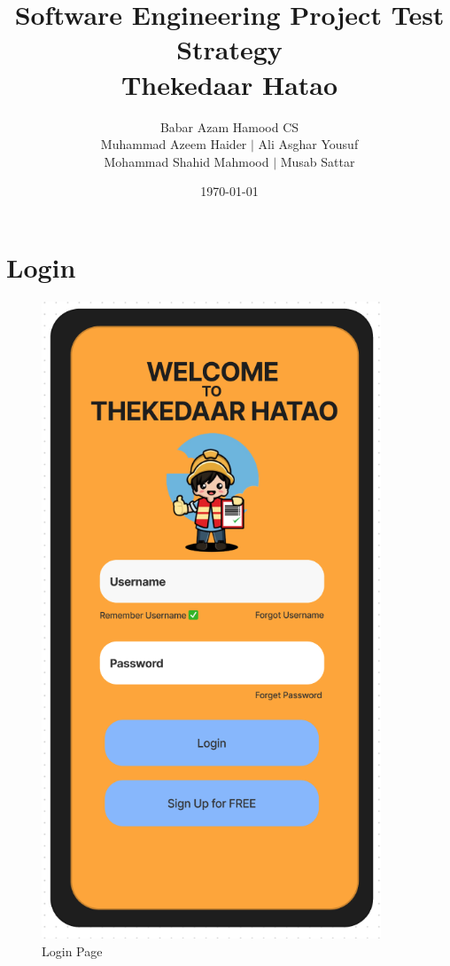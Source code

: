 \documentclass[title page]{article}
\title{Software Engineering Project Test Strategy\\
        Thekedaar Hatao}
\author{Babar Azam Hamood CS\\
        Muhammad Azeem Haider $\mid$ Ali Asghar Yousuf \\
        Mohammad Shahid Mahmood $\mid$ Musab Sattar}
\date{\today}
\begin{document}
\maketitle

\section{Login}
\begin{figure}[!h]
    \begin{center}
          \includegraphics[height=19cm]{login.png}
          \caption{Login Page}
          \label{fig:login}
    \end{center}
\end{figure}
\end{document}
